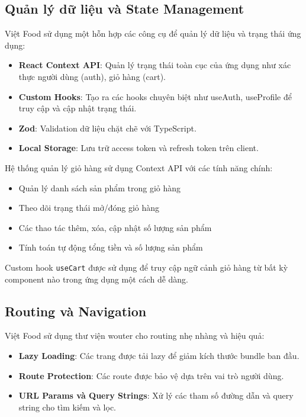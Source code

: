 \subsection{Quản lý dữ liệu và State Management}

Việt Food sử dụng một hỗn hợp các công cụ để quản lý dữ liệu và trạng thái ứng dụng:

\begin{itemize}
    \item \textbf{React Context API}: Quản lý trạng thái toàn cục của ứng dụng như xác thực người dùng (auth), giỏ hàng (cart).
    \item \textbf{Custom Hooks}: Tạo ra các hooks chuyên biệt như useAuth, useProfile để truy cập và cập nhật trạng thái.
    \item \textbf{Zod}: Validation dữ liệu chặt chẽ với TypeScript.
    \item \textbf{Local Storage}: Lưu trữ access token và refresh token trên client.
\end{itemize}

Hệ thống quản lý giỏ hàng sử dụng Context API với các tính năng chính:
\begin{itemize}
    \item Quản lý danh sách sản phẩm trong giỏ hàng
    \item Theo dõi trạng thái mở/đóng giỏ hàng
    \item Các thao tác thêm, xóa, cập nhật số lượng sản phẩm
    \item Tính toán tự động tổng tiền và số lượng sản phẩm
\end{itemize}

Custom hook \texttt{useCart} được sử dụng để truy cập ngữ cảnh giỏ hàng từ bất kỳ component nào trong ứng dụng một cách dễ dàng.

\subsection{Routing và Navigation}

Việt Food sử dụng thư viện wouter cho routing nhẹ nhàng và hiệu quả:

\begin{itemize}
    \item \textbf{Lazy Loading}: Các trang được tải lazy để giảm kích thước bundle ban đầu.
    \item \textbf{Route Protection}: Các route được bảo vệ dựa trên vai trò người dùng.
    \item \textbf{URL Params và Query Strings}: Xử lý các tham số đường dẫn và query string cho tìm kiếm và lọc.
\end{itemize}

